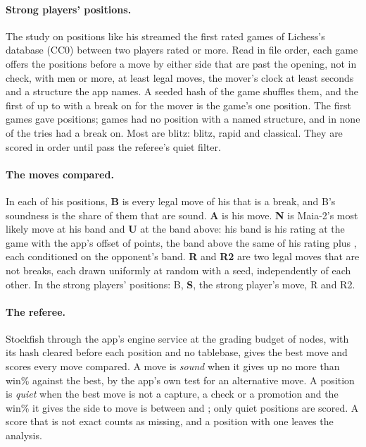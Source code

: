 \documentclass[11pt]{article}
\begin{document}
\paragraph{Strong players' positions.} The study on positions like his streamed the first
\StreamCap{} rated games of Lichess's \MonthName{} database (CC0) between two players rated
\Floor{} or more. Read in file order, each game offers the positions before a move by either
side that are past the opening, not in check, with \MinMen{} men or more, at least \MinLegal{}
legal moves, the mover's clock at least \ClockFloor{} seconds and a structure the app names. A
seeded hash of the game shuffles them, and the first of up to \Tries{} with a break on for the
mover is the game's one position. The first \StrongGamesRead{} games gave \StrongDrawn{}
positions; \StrongNoStructure{} games had no position with a named structure, and in
\StrongNotOn{} none of the tries had a break on. Most are blitz: \Blitz{} blitz, \Rapid{} rapid
and \Classical{} classical. They are scored in order until \StrongTarget{} pass the referee's
quiet filter.

\paragraph{The moves compared.} In each of his positions, \textbf{B} is every legal move of his
that is a break, and B's soundness is the share of them that are sound. \textbf{A} is his move.
\textbf{N} is Maia-2's most likely move at his band and \textbf{U} at the band above: his band is
his rating at the game with the app's offset of \Offset{} points, the band above the same of his
rating plus \Above, each conditioned on the opponent's band. \textbf{R} and \textbf{R2} are two
legal moves that are not breaks, each drawn uniformly at random with a seed, independently of each
other. In the strong players' positions: B, \textbf{S}, the strong player's move, R and R2.

\paragraph{The referee.} Stockfish through the app's engine service at the grading budget of
\GradeNodes{} nodes, with its hash cleared before each position and no tablebase, gives the best
move and scores every move compared. A move is \emph{sound} when it gives up no more than
\Window{} win\% against the best, by the app's own test for an alternative move. A position is
\emph{quiet} when the best move is not a capture, a check or a promotion and the win\% it gives
the side to move is between \WinLow{} and \WinHigh; only quiet positions are scored. A score
that is not exact counts as missing, and a position with one leaves the analysis.
\end{document}
